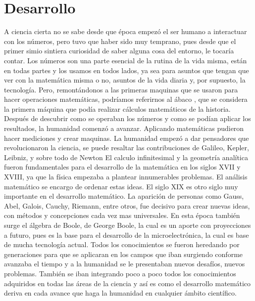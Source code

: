 \documentclass{article}
\begin{document}
\section{Desarrollo}
A ciencia cierta no se sabe desde que época empezó el ser humano a interactuar con los números, pero tuvo que haber sido muy temprano, pues desde que el primer simio sintiera curiosidad de saber alguna cosa del entorno, le tocaría contar. Los números son una parte esencial de la rutina de la vida misma, están en todas partes y los usamos en todos lados, ya sea para asuntos que tengan que ver con la matemática misma o no, asuntos de la vida diaria y, por supuesto, la tecnología. Pero, remontándonos a las primeras maquinas que se usaron para hacer operaciones matemáticas, podríamos referirnos al ábaco \citep{abaco}, que se considera la primera máquina que podía realizar cálculos matemáticos de la historia.
Después de descubrir como se operaban los números y como se podían aplicar los resultados, la humanidad comenzó a avanzar. Aplicando matemáticas pudieron hacer mediciones y crear maquinas. La humanidad empezó a dar pensadores que revolucionaron la ciencia, se puede resaltar las contribuciones de Galileo\citep{galileo}, Kepler\citep{kepler}, Leibniz\citep{lv}, y sobre todo de Newton \citep{nwtnr} 
El calculo infinitesimal y la geometría analítica fueron fundamentales para el desarrollo de la matemática en los siglos XVII y XVIII, ya que la física empezaba a plantear innumerables problemas. El análisis matemático se encargo de ordenar estas ideas.
El siglo XIX es otro siglo muy importante en el desarrollo matemático. La aparición de personas como Gauss\citep{gauss}, Abel\citep{abel}, Galois\citep{galois}, Cauchy\citep{cauchy}, Riemann\citep{riemann}, entre otros, fue decisivo para crear nuevas ideas, con métodos y concepciones cada vez mas universales.
En esta época también surge el álgebra de Boole, de George Boole\citep{boole}, la cual es un aporte con proyecciones a futuro, pues es la base para el desarrollo de la microelectrónica, la cual es base de mucha tecnología actual.
Todos los conocimientos se fueron heredando por generaciones para que se aplicaran en los campos que iban surgiendo conforme avanzaba el tiempo y a la humanidad se le presentaban nuevos desafíos, nuevos problemas. También se iban integrando poco a poco todos los conocimientos adquiridos en todas las áreas de la ciencia y así es como el desarrollo matemático deriva en cada avance que haga la humanidad en cualquier ámbito científico.
\end{document}
